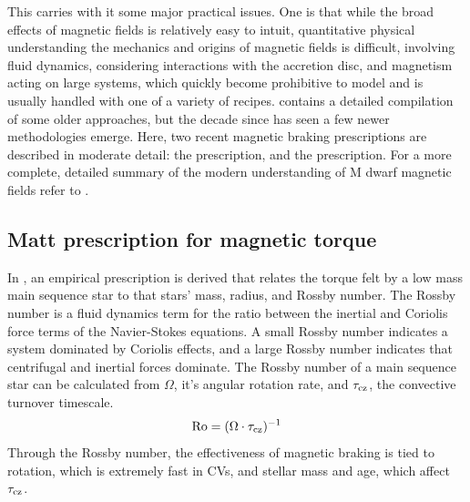 This carries with it some major practical issues. One is that while the broad effects of magnetic fields is relatively easy to intuit, quantitative physical understanding the mechanics and origins of magnetic fields is difficult, involving fluid dynamics, considering interactions with the accretion disc, and magnetism acting on large systems, which quickly become prohibitive to model and is usually handled with one of a variety of recipes. \citealt{knigge11} contains a detailed compilation of some older approaches, but the decade since has seen a few newer methodologies emerge. Here, two recent magnetic braking prescriptions are described in moderate detail: the \citet{matt2015} prescription, and the \citet{garraffo2018a} prescription. For a more complete, detailed summary of the modern understanding of M dwarf magnetic fields refer to \citet{kochukhov2021}. 


\subsection{Matt prescription for magnetic torque}
\label{sect:introduction:matt braking}

In \citet{matt2015}, an empirical prescription is derived that relates the torque felt by a low mass main sequence star to that stars' mass, radius, and Rossby number. The Rossby number is a fluid dynamics term for the ratio between the inertial and Coriolis force terms of the Navier-Stokes equations. A small Rossby number indicates a system dominated by Coriolis effects, and a large Rossby number indicates that centrifugal and inertial forces dominate. The Rossby number of a main sequence star can be calculated from $\Omega$, it's angular rotation rate, and $\tau_{\rm cz}$, the convective turnover timescale.
\begin{equation}
    \label{eqn:introduction:rossby number}
    {\rm Ro} = (\Omega \cdot \tau_{\rm cz})^{-1}
\end{equation}
Through the Rossby number, the effectiveness of magnetic braking is tied to rotation, which is extremely fast in CVs, and stellar mass and age, which affect $\tau_{\rm cz}$.

